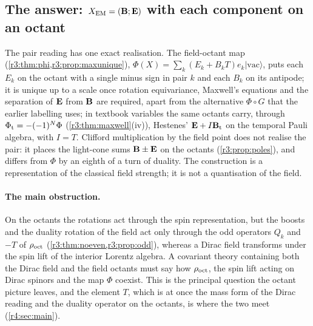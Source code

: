 \subsection{\texorpdfstring{The answer: $X_{\rm EM}=(\mathbf B;\mathbf E)$ with each component on an octant}{The answer: X\_EM = (B;E) with each component on an octant}}
\label{r3:sec:answer}

The pair reading has one exact realisation. The field-octant map (\cref{r3:thm:phi,r3:prop:maxunique}),
$\Phi(X)=\sum_k(E_k+B_kT)e_k|\mathrm{vac}\rangle$, puts each $E_k$ on the octant with a single minus sign in pair $k$ and each $B_k$ on its antipode; it
is unique up to a scale once rotation equivariance, Maxwell's equations and the separation of $\mathbf E$ from $\mathbf B$ are required, apart from the
alternative $\Phi\circ G$ that the earlier labelling uses; in textbook variables the same octants carry, through $\Phi_{\rm t}=-(-1)^N\Phi$
(\cref{r3:thm:maxwell}(iv)), Hestenes' $\mathbf E+I\mathbf B_{\rm t}$ on the temporal Pauli algebra, with $I=T$. Clifford multiplication by the field point does
not realise the pair: it places the light-cone sums $\mathbf B\pm\mathbf E$ on the octants (\cref{r3:prop:poles}), and differs from $\Phi$ by an eighth of a turn
of duality. The construction is a representation of the classical field strength; it is not a quantisation of the field.

\paragraph{The main obstruction.} On the octants the rotations act through the spin representation, but the boosts and the duality rotation
of the field act only through the odd operators $Q_k$ and $-T$ of $\rho_{\rm oct}$ (\cref{r3:thm:noeven,r3:prop:odd}), whereas a Dirac field transforms
under the spin lift of the interior Lorentz algebra. A covariant theory containing both the Dirac field and the field octants must say how
$\rho_{\rm oct}$, the spin lift acting on Dirac spinors and the map $\Phi$ coexist. This is the principal question the octant picture leaves, and the
element $T$, which is at once the mass form of the Dirac reading and the duality operator on the octants, is where the two meet
(\cref{r4:sec:main}).

